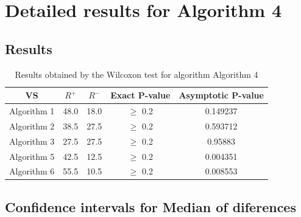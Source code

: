 \documentclass[a4paper,10pt]{article}
\begin{document}
 \clearpage 


\section{Detailed results for Algorithm 4}


\subsection{Results}

\begin{table}[!htp]
\centering\small
\begin{tabular}{
|c|c|c|c|c|}
\hline
 VS & $R^{+}$ & $R^{-}$ & Exact P-value & Asymptotic P-value \\ \hline 
Algorithm 1 & 48.0 & 18.0 & $\geq$ 0.2 & 0.149237\\ \hline 
Algorithm 2 & 38.5 & 27.5 & $\geq$ 0.2 & 0.593712\\ \hline 
Algorithm 3 & 27.5 & 27.5 & $\geq$ 0.2 & 0.95883\\ \hline 
Algorithm 5 & 42.5 & 12.5 & $\geq$ 0.2 & 0.004351\\ \hline 
Algorithm 6 & 55.5 & 10.5 & $\geq$ 0.2 & 0.008553\\ \hline 

\end{tabular}
\caption{Results obtained by the Wilcoxon test for algorithm Algorithm 4}
\end{table}

\subsection{Confidence intervals for Median of diferences}
\end{document}
